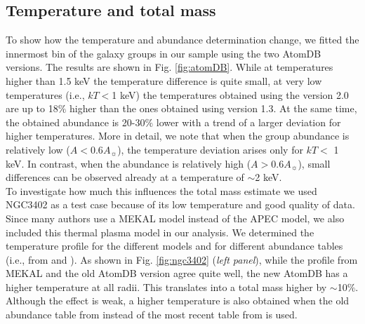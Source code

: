 \documentclass{aa} %
\begin{document}
\begin{appendix}
\subsection{Temperature and total mass}
To show how the temperature and abundance determination change, we
fitted the innermost bin of the galaxy groups in our sample using the
two AtomDB versions. The results are shown in
Fig. \ref{fig:atomDB}. While at temperatures higher than 1.5 keV the
temperature difference is quite small, at very low temperatures
(i.e., $kT$$<$1 keV) the temperatures obtained using the version 2.0
are up to 18$\%$ higher than the ones obtained using version 1.3. At
the same time, the obtained abundance is 20-30$\%$ lower with a trend
of a larger deviation for higher temperatures. More in detail, we note
that when the group abundance is relatively low
($A$$<$0.6$A$$_{\sun}$), the temperature deviation arises only for
$kT$$<$ 1 keV. In contrast, when the abundance is relatively high
($A$$>$0.6$A$$_{\sun}$), small differences can be observed
already at a temperature of $\sim$2 keV.\\
To investigate how much this influences the total mass estimate 
we used NGC3402 as a test case because of its low temperature and good
quality of data. Since many authors use a MEKAL model
instead of the APEC model, we also included this thermal plasma model
in our analysis. We determined the temperature profile for the
different models and for different abundance tables (i.e., from
\citealt{1989GeCoA..53..197A} and \citealt{2009ARA&A..47..481A}). As
shown in Fig. \ref{fig:ngc3402} ({\it left panel}), while the profile
from MEKAL and the old AtomDB version agree quite well, the new AtomDB
has a higher temperature at all radii. This translates into a 
total mass higher by $\sim$10$\%$. Although the effect is weak, a higher temperature is also
obtained when the old abundance table from \citet{1989GeCoA..53..197A}
instead of the most recent table from \citet{2009ARA&A..47..481A} is
used. 


\end{appendix}
\end{document}
